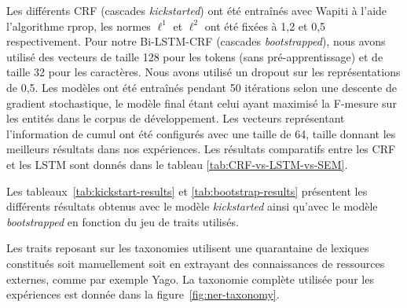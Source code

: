 \documentclass[12pt,a4paper,times,twoside,openright]{report}
\begin{document}
Les différents CRF (cascades \textit{kickstarted}) ont été entraînés avec Wapiti à l'aide l'algorithme rprop, les normes $\ell^{1}$ et $\ell^{2}$ ont été fixées à 1,2 et 0,5 respectivement. Pour notre Bi-LSTM-CRF (cascades \textit{bootstrapped}), nous avons utilisé des vecteurs de taille 128 pour les tokens (sans pré-apprentissage) et de taille 32 pour les caractères. Nous avons utilisé un dropout sur les représentations de 0,5. Les modèles ont été entraînés pendant 50 itérations selon une descente de gradient stochastique, le modèle final étant celui ayant maximisé la F-mesure sur les entités dans le corpus de développement. Les vecteurs représentant l'information de cumul ont été configurés avec une taille de 64, taille donnant les meilleurs résultats dans nos expériences. Les résultats comparatifs entre les CRF et les LSTM sont donnés dans le tableau \ref{tab:CRF-vs-LSTM-vs-SEM}.

Les tableaux\ \ref{tab:kickstart-results} et \ref{tab:bootstrap-results} présentent les différents résultats obtenus avec le modèle \emph{kickstarted} ainsi qu'avec le modèle \emph{bootstrapped} en fonction du jeu de traits utilisés.

Les traits reposant sur les taxonomies utilisent une quarantaine de lexiques constitués soit manuellement soit en extrayant des connaissances de ressources externes, comme par exemple Yago. La taxonomie complète utilisée pour les expériences est donnée dans la figure\ \ref{fig:ner-taxonomy}.
\end{document}

